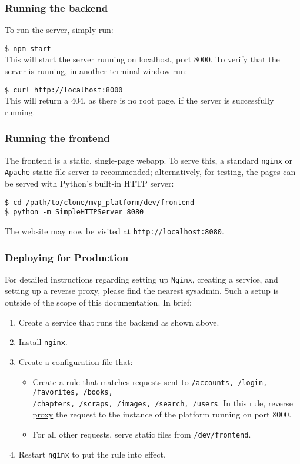 \documentclass[onecolumn, draftclsnofoot,10pt, compsoc]{IEEEtran}
\begin{document}
\subsubsection{Running the backend}

To run the server, simply run:

\verb|$ npm start| \\

\noindent This will start the server running on localhost, port 8000. To verify that the server is running, in another terminal window run:

\verb|$ curl http://localhost:8000| \\

\noindent This will return a 404, as there is no root page, if the server is successfully running.

\subsubsection{Running the frontend}

The frontend is a static, single-page webapp. To serve this, a standard \verb|nginx| or \verb|Apache| static file server is recommended; alternatively, for testing, the pages can be served with Python's built-in HTTP server:

\begin{verbatim}
$ cd /path/to/clone/mvp_platform/dev/frontend
$ python -m SimpleHTTPServer 8080
\end{verbatim}

\noindent The website may now be visited at \verb|http://localhost:8080|.

\subsubsection{Deploying for Production}

For detailed instructions regarding setting up \verb|Nginx|, creating a service, and setting up a reverse proxy, please find the nearest sysadmin. Such a setup is outside of the scope of this documentation. In brief:

\begin{enumerate}
	\item Create a service that runs the backend as shown above. 
	\item Install \verb|nginx|. 
	\item Create a configuration file that:
	\begin{itemize}
		\item Create a rule that matches requests sent to \verb|/accounts, /login, /favorites, /books,| \\ \verb|/chapters, /scraps, /images, /search, /users|. In this rule, \href{https://www.nginx.com/resources/admin-guide/reverse-proxy/}{reverse proxy} the request to the instance of the platform running on port 8000.
		\item For all other requests, serve static files from \verb|/dev/frontend|.
	\end{itemize}
	\item Restart \verb|nginx| to put the rule into effect.
	
\end{enumerate}
\end{document}
